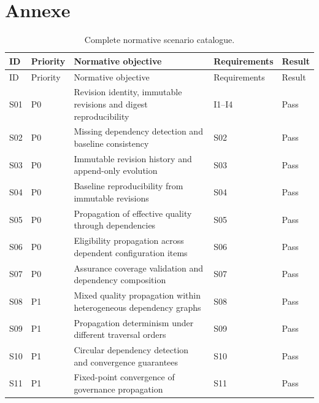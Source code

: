 \documentclass[10pt]{article}
\begin{document}
\section{Annexe}
\label{sec:annexe}
\begin{longtable}{p{0.9cm}p{2cm}p{6.2cm}p{2.3cm}p{1.6cm}}
\caption{Complete normative scenario catalogue.}
\label{tab:appendix_scenarios}\\

\toprule
ID &
Priority &
Normative objective &
Requirements &
Result \\
\midrule
\endfirsthead

\toprule
ID &
Priority &
Normative objective &
Requirements &
Result \\
\midrule
\endhead

S01 &
P0 &
Revision identity, immutable revisions and digest reproducibility &
I1--I4 &
Pass \\

S02 &
P0 &
Missing dependency detection and baseline consistency &
S02 &
Pass \\

S03 &
P0 &
Immutable revision history and append-only evolution &
S03 &
Pass \\

S04 &
P0 &
Baseline reproducibility from immutable revisions &
S04 &
Pass \\

S05 &
P0 &
Propagation of effective quality through dependencies &
S05 &
Pass \\

S06 &
P0 &
Eligibility propagation across dependent configuration items &
S06 &
Pass \\

S07 &
P0 &
Assurance coverage validation and dependency composition &
S07 &
Pass \\

S08 &
P1 &
Mixed quality propagation within heterogeneous dependency graphs &
S08 &
Pass \\

S09 &
P1 &
Propagation determinism under different traversal orders &
S09 &
Pass \\

S10 &
P1 &
Circular dependency detection and convergence guarantees &
S10 &
Pass \\

S11 &
P1 &
Fixed-point convergence of governance propagation &
S11 &
Pass \\


\end{longtable}
\end{document}
